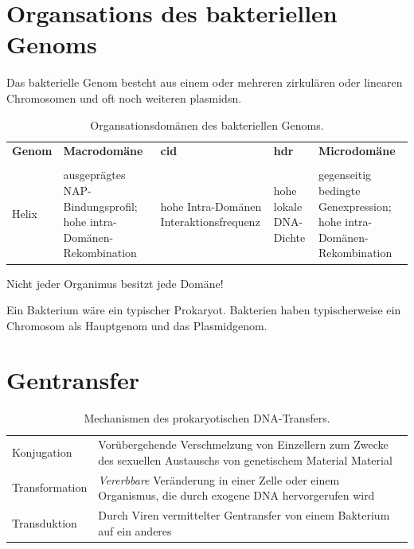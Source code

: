 \section{Organsations des bakteriellen Genoms}
Das bakterielle Genom besteht aus einem oder mehreren zirkulären oder linearen Chromosomen und oft noch weiteren \Glspl{plasmid}n. 
\begin{table}[H]
    \centering
    \begin{tabular}{p{1cm}p{3cm}p{3cm}p{3cm}p{3cm}}
        \textbf{Genom} & \textbf{Macrodomäne} & \textbf{\gls{cid}} & \textbf{\gls{hdr}} & \textbf{Microdomäne} \\ \\
        Helix & ausgeprägtes NAP-Bindungsprofil; hohe intra-Domänen-Rekombination & hohe Intra-Domänen Interaktionsfrequenz & hohe lokale DNA-Dichte & gegenseitig bedingte Genexpression; hohe intra-Domänen-Rekombination
    \end{tabular}
    \caption{Organsationsdomänen des bakteriellen Genoms.}
    \label{tab:Organsationsdomänen}
\end{table}
\noindent Nicht jeder Organimus besitzt jede Domäne! 
\begin{mechanism}[title=Wie viele Genome gibt es in einem typischen Prokaryoten?]
Ein Bakterium wäre ein typischer Prokaryot. Bakterien haben typischerweise ein Chromosom als Hauptgenom und das Plasmidgenom. 
\end{mechanism}

\section{Gentransfer} 
\begin{table}[H]
    \begin{tabular}{p{4cm}p{11cm}}
        Konjugation \index{Konjugation} & Vorübergehende Verschmelzung von Einzellern zum Zwecke des sexuellen Austauschs von genetischem Material
Material  \\
       Transformation \index{Transformation}  & \textit{Vererbbare} Veränderung in einer Zelle oder einem Organismus, die durch exogene DNA hervorgerufen wird \\
       Transduktion \index{Transduktion} & Durch Viren vermittelter Gentransfer von einem Bakterium auf ein anderes
    \end{tabular}
    \caption{Mechanismen des prokaryotischen DNA-Transfers.}
    \label{tab:prokdnatransfer}
\end{table}


